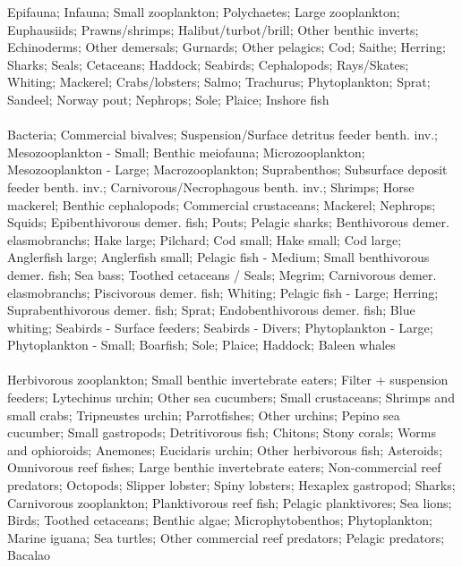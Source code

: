 \hline
Epifauna; Infauna; Small zooplankton; Polychaetes; Large zooplankton; Euphausiids; Prawns/shrimps; Halibut/turbot/brill; Other benthic inverts; Echinoderms; Other demersals; Gurnards; Other pelagics; Cod; Saithe; Herring; Sharks; Seals; Cetaceans; Haddock; Seabirds; Cephalopods; Rays/Skates; Whiting; Mackerel; Crabs/lobsters; Salmo; Trachurus; Phytoplankton; Sprat; Sandeel; Norway pout; Nephrops; Sole; Plaice; Inshore fish\\
\fullhline
\hline
{} \\
\hline
Bacteria; Commercial bivalves; Suspension/Surface detritus feeder benth. inv.; Mesozooplankton - Small; Benthic meiofauna; Microzooplankton; Mesozooplankton - Large; Macrozooplankton; Suprabenthos; Subsurface deposit feeder benth. inv.; Carnivorous/Necrophagous benth. inv.; Shrimps; Horse mackerel; Benthic cephalopods; Commercial crustaceans; Mackerel; Nephrops; Squids; Epibenthivorous demer. fish; Pouts; Pelagic sharks; Benthivorous demer. elasmobranchs; Hake large; Pilchard; Cod small; Hake small; Cod large; Anglerfish large; Anglerfish small; Pelagic fish - Medium; Small benthivorous demer. fish; Sea bass; Toothed cetaceans / Seals; Megrim; Carnivorous demer. elasmobranchs; Piscivorous demer. fish; Whiting; Pelagic fish - Large; Herring; Suprabenthivorous demer. fish; Sprat; Endobenthivorous demer. fish; Blue whiting; Seabirds - Surface feeders; Seabirds - Divers; Phytoplankton - Large; Phytoplankton - Small; Boarfish; Sole; Plaice; Haddock; Baleen whales\\
\fullhline
\hline
{} \\
\hline
Herbivorous zooplankton; Small benthic invertebrate eaters; Filter + suspension feeders; Lytechinus urchin; Other sea cucumbers; Small crustaceans; Shrimps and small crabs; Tripneustes urchin; Parrotfishes; Other urchins; Pepino sea cucumber; Small gastropods; Detritivorous fish; Chitons; Stony corals; Worms and ophioroids; Anemones; Eucidaris urchin; Other herbivorous fish; Asteroids; Omnivorous reef fishes; Large benthic invertebrate eaters; Non-commercial reef predators; Octopods; Slipper lobster; Spiny lobsters; Hexaplex gastropod; Sharks; Carnivorous zooplankton; Planktivorous reef fish; Pelagic planktivores; Sea lions; Birds; Toothed cetaceans; Benthic algae; Microphytobenthos; Phytoplankton; Marine iguana; Sea turtles; Other commercial reef predators; Pelagic predators; Bacalao\\
